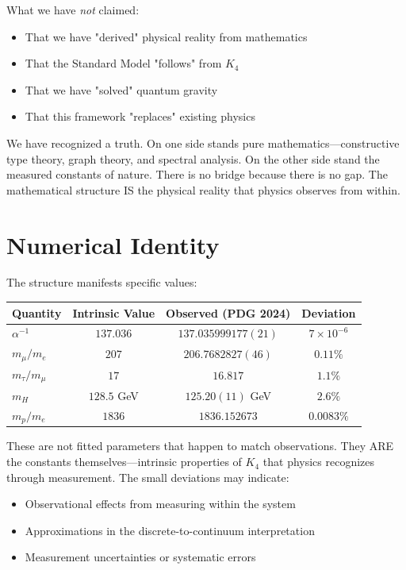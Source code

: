 \documentclass[11pt,a4paper]{book}
\begin{document}
What we have \emph{not} claimed:
\begin{itemize}
\item That we have "derived" physical reality from mathematics
\item That the Standard Model "follows" from $K_4$
\item That we have "solved" quantum gravity
\item That this framework "replaces" existing physics
\end{itemize}

We have recognized a truth. On one side stands pure mathematics—constructive type theory, graph theory, and spectral analysis. On the other side stand the measured constants of nature. There is no bridge because there is no gap. The mathematical structure IS the physical reality that physics observes from within.

\section{Numerical Identity}

The structure manifests specific values:

\begin{center}
\begin{tabular}{lccc}
\hline
\textbf{Quantity} & \textbf{Intrinsic Value} & \textbf{Observed (PDG 2024)} & \textbf{Deviation} \\
\hline
$\alpha^{-1}$ & $137.036$ & $137.035999177(21)$ & $7 \times 10^{-6}$ \\
$m_\mu / m_e$ & $207$ & $206.7682827(46)$ & $0.11\%$ \\
$m_\tau / m_\mu$ & $17$ & $16.817$ & $1.1\%$ \\
$m_H$ & $128.5$ GeV & $125.20(11)$ GeV & $2.6\%$ \\
$m_p / m_e$ & $1836$ & $1836.152673$ & $0.0083\%$ \\
\hline
\end{tabular}
\end{center}

These are not fitted parameters that happen to match observations. They ARE the constants themselves—intrinsic properties of $K_4$ that physics recognizes through measurement. The small deviations may indicate:
\begin{itemize}
\item Observational effects from measuring within the system
\item Approximations in the discrete-to-continuum interpretation
\item Measurement uncertainties or systematic errors
\end{itemize}
\end{document}

